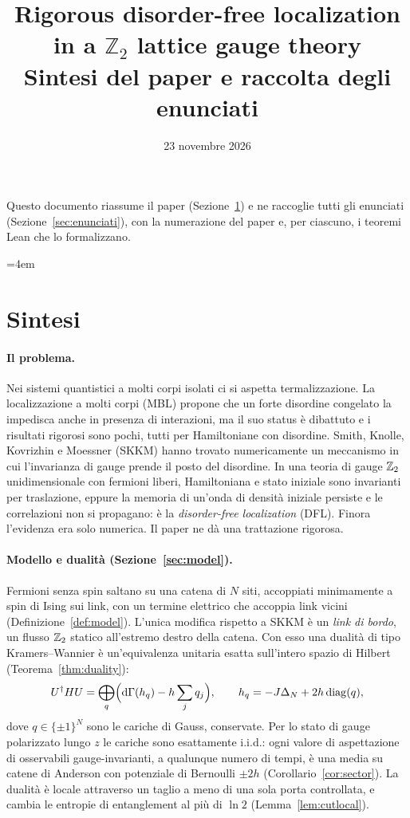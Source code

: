 \documentclass[11pt]{article}
\title{Rigorous disorder-free localization in a $\mathbb{Z}_2$ lattice gauge theory\\[8pt]
\large Sintesi del paper e raccolta degli enunciati}
\author{}
\date{23 novembre 2026}
\theoremstyle{stmtplain}
\theoremstyle{stmtdef}
\begin{document}
\maketitle

\noindent Questo documento riassume il paper (Sezione~\ref{sec:sintesi}) e ne raccoglie tutti gli enunciati
(Sezione~\ref{sec:enunciati}), con la numerazione del paper e, per ciascuno, i teoremi Lean che lo formalizzano.

\tableofcontents

\begingroup
{}  \emergencystretch=4em
\section{Sintesi}\label{sec:sintesi}

\paragraph{Il problema.}
Nei sistemi quantistici a molti corpi isolati ci si aspetta termalizzazione. La localizzazione a molti corpi (MBL)
propone che un forte disordine congelato la impedisca anche in presenza di interazioni, ma il suo status è
dibattuto e i risultati rigorosi sono pochi, tutti per Hamiltoniane con disordine. Smith, Knolle, Kovrizhin e
Moessner (SKKM) hanno trovato numericamente un meccanismo in cui l'invarianza di gauge prende il posto del
disordine. In una teoria di gauge $\mathbb{Z}_2$ unidimensionale con fermioni liberi, Hamiltoniana e stato iniziale sono
invarianti per traslazione, eppure la memoria di un'onda di densità iniziale persiste e le correlazioni non si
propagano: è la \emph{disorder-free localization} (DFL). Finora l'evidenza era solo numerica. Il paper ne dà una
trattazione rigorosa.

\paragraph{Modello e dualità (Sezione~\ref{sec:model}).}
Fermioni senza spin saltano su una catena di $N$ siti, accoppiati minimamente a spin di Ising sui link, con un
termine elettrico che accoppia link vicini (Definizione~\ref{def:model}). L'unica modifica rispetto a SKKM è un
\emph{link di bordo}, un flusso $\mathbb{Z}_2$ statico all'estremo destro della catena. Con esso una dualità di tipo
Kramers--Wannier è un'equivalenza unitaria esatta sull'intero spazio di Hilbert (Teorema~\ref{thm:duality}):
\[
  U^\dagger HU=\bigoplus_q\Bigl(\mathrm{d}\Gamma(h_{q})-h\sum_jq_j\Bigr),\qquad h_{q}=-J\Delta_N+2h\operatorname{diag}(q),
\]
dove $q\in\{\pm1\}^N$ sono le cariche di Gauss, conservate. Per lo stato di gauge polarizzato lungo $z$ le cariche
sono esattamente i.i.d.: ogni valore di aspettazione di osservabili gauge-invarianti, a qualunque numero di tempi,
è una media su catene di Anderson con potenziale di Bernoulli $\pm2h$ (Corollario~\ref{cor:sector}). La dualità è
locale attraverso un taglio a meno di una sola porta controllata, e cambia le entropie di entanglement al più di
$\ln2$ (Lemma~\ref{lem:cutlocal}).
\end{document}
